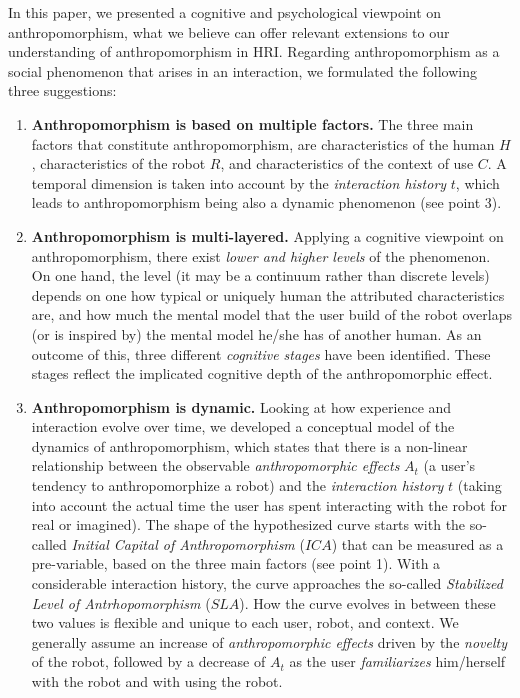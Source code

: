 \documentclass{frontiersSCNS} %
\begin{document}
In this paper, we presented a cognitive and psychological viewpoint on anthropomorphism, what we believe can offer relevant extensions to our understanding of anthropomorphism in HRI. Regarding anthropomorphism as a social phenomenon that arises in an interaction, we formulated the following three suggestions:
\begin{enumerate}
\item \textbf{Anthropomorphism is based on multiple factors.} The three main factors that constitute anthropomorphism, are characteristics of the human $H$, characteristics of the robot $R$, and characteristics of the context of use $C$. A temporal dimension is taken into account by the \textit{interaction history} $t$, which leads to anthropomorphism being also a dynamic phenomenon (see point 3).
\item \textbf{Anthropomorphism is multi-layered.} Applying a cognitive viewpoint on anthropomorphism, there exist \textit{lower and higher levels} of the phenomenon. On one hand, the level (it may be a continuum rather than discrete levels) depends on one how typical or uniquely human the attributed characteristics are, and how much the mental model that the user build of the robot overlaps (or is inspired by) the mental model he/she has of another human. As an outcome of this, three different \textit{cognitive stages} have been identified. These stages reflect the implicated cognitive depth of the anthropomorphic effect.
\item \textbf{Anthropomorphism is dynamic.} Looking at how experience and interaction evolve over time, we developed a conceptual model of the dynamics of anthropomorphism, which states that there is a non-linear relationship between the observable \textit{anthropomorphic effects} $A_t$ (a user's tendency to anthropomorphize a robot) and the \textit{interaction history} $t$ (taking into account the actual time the user has spent interacting with the robot for real or imagined). The shape of the hypothesized curve starts with the so-called \textit{Initial Capital of Anthropomorphism} ($ICA$) that can be measured as a pre-variable, based on the three main factors (see point 1). With a considerable interaction history, the curve approaches the so-called \textit{Stabilized Level of Antrhopomorphism} ($SLA$). How the curve evolves in between these two values is flexible and unique to each user, robot, and context. We generally assume an increase of \textit{anthropomorphic effects} driven by the \textit{novelty} of the robot, followed by a decrease of $A_t$ as the user \textit{familiarizes} him/herself with the robot and with using the robot. 
\end{enumerate}
\end{document}
